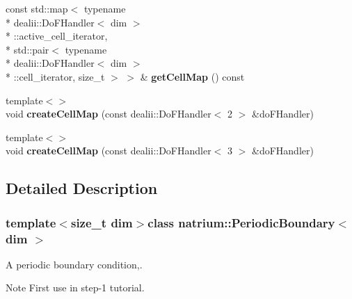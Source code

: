 \begin{DoxyCompactItemize}
\item 
\hypertarget{classnatrium_1_1PeriodicBoundary_a2b72df382be0d95e3c1aeebf30d2d3dc}{const std\-::map$<$ typename \\*
dealii\-::\-Do\-F\-Handler$<$ dim $>$\\*
\-::active\-\_\-cell\-\_\-iterator, \\*
std\-::pair$<$ typename \\*
dealii\-::\-Do\-F\-Handler$<$ dim $>$\\*
\-::cell\-\_\-iterator, size\-\_\-t $>$ $>$ \& {\bfseries get\-Cell\-Map} () const }\label{classnatrium_1_1PeriodicBoundary_a2b72df382be0d95e3c1aeebf30d2d3dc}

\item 
\hypertarget{classnatrium_1_1PeriodicBoundary_a020c4ee339ab6e170054c72302c42eea}{{\footnotesize template$<$$>$ }\\void {\bfseries create\-Cell\-Map} (const dealii\-::\-Do\-F\-Handler$<$ 2 $>$ \&do\-F\-Handler)}\label{classnatrium_1_1PeriodicBoundary_a020c4ee339ab6e170054c72302c42eea}

\item 
\hypertarget{classnatrium_1_1PeriodicBoundary_afa65844dfc07183155f5ba6ba56c0ebf}{{\footnotesize template$<$$>$ }\\void {\bfseries create\-Cell\-Map} (const dealii\-::\-Do\-F\-Handler$<$ 3 $>$ \&do\-F\-Handler)}\label{classnatrium_1_1PeriodicBoundary_afa65844dfc07183155f5ba6ba56c0ebf}

\end{DoxyCompactItemize}


\subsection{Detailed Description}
\subsubsection*{template$<$size\-\_\-t dim$>$class natrium\-::\-Periodic\-Boundary$<$ dim $>$}

A periodic boundary condition,. 

\begin{DoxyNote}{Note}
First use in step-\/1 tutorial. 
\end{DoxyNote}


